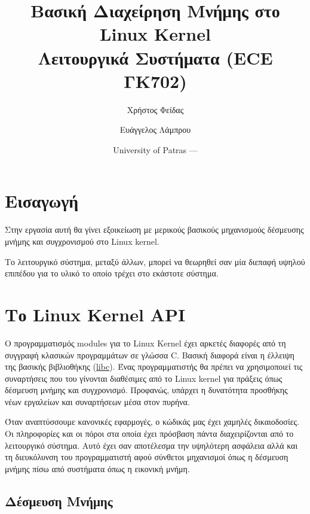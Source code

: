 \documentclass[18pt]{extarticle}
\title{Βασική Διαχείρηση Μνήμης στο Linux Kernel \\Λειτουργικά Συστήματα (ECE ΓΚ702)} %
\author{\footnotesize Χρήστος Φείδας\\ \footnotesize \src{fidas@upatras.gr} \and \footnotesize Ευάγγελος Λάμπρου\\ \footnotesize \src{e.lamprou@upnet.gr}} %
\author{}
\date{University of Patras --- \the\year{}} %
\begin{document}
\pagestyle{fancy} 
\fancyhf{} %
\renewcommand{\headrulewidth}{0pt}
\fancyhead{} %
\fancyfoot{} %
\fancyfoot[R]{\thepage}

\maketitle


\section{Εισαγωγή}

Στην εργασία αυτή θα γίνει εξοικείωση με μερικούς βασικούς μηχανισμούς δέσμευσης μνήμης και συγχρονισμού στο Linux kernel.

Το λειτουργικό σύστημα, μεταξύ άλλων, μπορεί να θεωρηθεί σαν μία διεπαφή υψηλού επιπέδου για το υλικό το οποίο τρέχει στο εκάστοτε σύστημα.

\section{Το Linux Kernel API}

Ο προγραμματισμός modules για το Linux Kernel έχει αρκετές διαφορές από τη συγγραφή κλασικών προγραμμάτων σε γλώσσα C.
Βασική διαφορά είναι η έλλειψη της βασικής βιβλιοθήκης (\href{https://man7.org/linux/man-pages/man7/libc.7.html}{libc}). 
Ένας προγραμματιστής θα πρέπει να χρησιμοποιεί τις συναρτήσεις που του γίνονται διαθέσιμες από το Linux kernel για πράξεις όπως δέσμευση μνήμης και συγχρονισμό.
Προφανώς, υπάρχει η δυνατότητα προσθήκης νέων εργαλείων και συναρτήσεων μέσα στον πυρήνα.

Όταν αναπτύσσουμε κανονικές εφαρμογές, ο κώδικάς μας έχει χαμηλές δικαιοδοσίες.
Οι πληροφορίες και οι πόροι στα οποία έχει πρόσβαση πάντα διαχειρίζονται από το λειτουργικό σύστημα.
Αυτό έχει σαν αποτέλεσμα την υψηλότερη ασφάλεια αλλά και τη διευκόλυνση του προγραμματιστή αφού 
σύνθετοι μηχανισμοί όπως η δέσμευση μνήμης  πίσω από συστήματα όπως η εικονική μνήμη.

\subsection{Δέσμευση Μνήμης}
\end{document}
